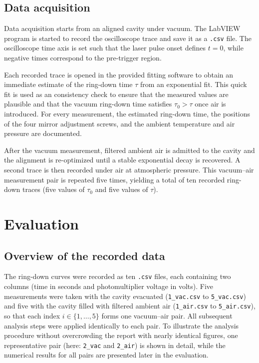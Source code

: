 \documentclass[a4paper]{article}
\begin{document}
\subsection{Data acquisition}
Data acquisition starts from an aligned cavity under vacuum.
The LabVIEW program is started to record the oscilloscope trace and save it as a \texttt{.csv} file.
The oscilloscope time axis is set such that the laser pulse onset defines $t=0$, while negative times correspond to the pre-trigger region.

Each recorded trace is opened in the provided fitting software to obtain an immediate estimate of the ring-down time $\tau$ from an exponential fit.
This quick fit is used as an consistency check to ensure that the measured values are plausible and that the vacuum ring-down time satisfies $\tau_0>\tau$ once air is introduced.
For every measurement, the estimated ring-down time, the positions of the four mirror adjustment screws, and the ambient temperature and air pressure are documented.

After the vacuum measurement, filtered ambient air is admitted to the cavity and the alignment is re-optimized until a stable exponential decay is recovered.
A second trace is then recorded under air at atmospheric pressure.
This vacuum--air measurement pair is repeated five times, yielding a total of ten recorded ring-down traces (five values of $\tau_0$ and five values of $\tau$).

\section{Evaluation}
\label{sec:evaluation}

\subsection{Overview of the recorded data}
\label{sec:evaluation_overview}

The ring-down curves were recorded as ten \texttt{.csv} files, each containing two columns (time in seconds and photomultiplier voltage in volts).
Five measurements were taken with the cavity evacuated (\texttt{1\_vac.csv} to \texttt{5\_vac.csv}) and five with the cavity filled with filtered ambient air (\texttt{1\_air.csv} to \texttt{5\_air.csv}), so that each index $i\in\{1,\dots,5\}$ forms one vacuum--air pair.
All subsequent analysis steps were applied identically to each pair.
To illustrate the analysis procedure without overcrowding the report with nearly identical figures, one representative pair (here: \texttt{2\_vac} and \texttt{2\_air}) is shown in detail, while the numerical results for all pairs are presented later in the evaluation.
\end{document}
